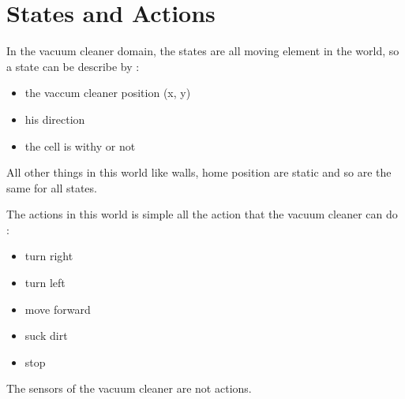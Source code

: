 \section{States and Actions}
In the vacuum cleaner domain, the states are all moving element in the world, so a state can be describe by :
\begin{itemize}
  \item the vaccum cleaner position (x, y)
  \item his direction
  \item the cell is withy or not
\end{itemize}

All other things in this world like walls, home position are static and so are the same for all states.

The actions in this world is simple all the action that the vacuum cleaner can do : 
\begin{itemize}
  \item turn right
  \item turn left
  \item move forward
  \item suck dirt
  \item stop
\end{itemize}

The sensors of the vacuum cleaner are not actions.

